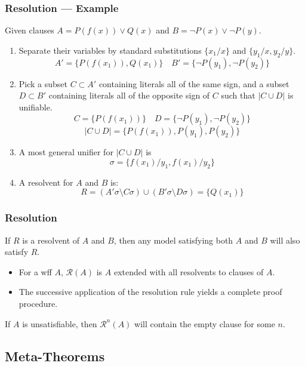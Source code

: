 \documentclass[UTF8,aspectratio=43,11pt,colorlinks,compress,openany]{beamer}%
\begin{document}
\begin{frame}\frametitle{Resolution --- Example}
Given clauses $A=P(f(x))\vee Q(x)$ and $B=\neg P(x)\vee\neg P(y)$.
\begin{enumerate}
\item Separate their variables by standard substitutions $\{x_1/x\}$ and $\{y_1/x,y_2/y\}$.
\[A'=\big\{P(f(x_1)), Q(x_1)\big\}\quad B'=\big\{\neg P(y_1), \neg P(y_2)\big\}\]
\item Pick a subset $C\subset A'$ containing literals all of the same sign, and a subset $D\subset B'$ containing literals all of the opposite sign of $C$ such that $|C\cup D|$ is unifiable.
\[C=\big\{P(f(x_1))\big\}\quad D=\big\{\neg P(y_1), \neg P(y_2)\big\}\]
\[|C\cup D|=\big\{P(f(x_1)), P(y_1), P(y_2)\big\}\]
\item A most general unifier for $|C\cup D|$ is
\[\sigma=\big\{f(x_1)/y_1,f(x_1)/y_2\big\}\]
\item A resolvent for $A$ and $B$ is:
\[R=(A'\sigma\setminus C\sigma)\cup(B'\sigma\setminus D\sigma)=\big\{Q(x_1)\big\}\]
\end{enumerate}
\end{frame}

\begin{frame}\frametitle{Resolution}
\begin{theorem}[Soundness]
If $R$ is a resolvent of $A$ and $B$, then any model satisfying both $A$ and $B$ will also satisfy $R$.
\end{theorem}
\begin{itemize}
\item For a wff $A$, $\mathcal{R}(A)$ is $A$ extended with all resolvents to clauses of $A$.
\item The successive application of the resolution rule yields a complete proof procedure.
\end{itemize}
\begin{theorem}[Completeness]
If $A$ is unsatisfiable, then $\mathcal{R}^n(A)$ will contain the empty clause for some $n$.
\end{theorem}
\end{frame}

\subsection{Meta-Theorems}
\end{document}
